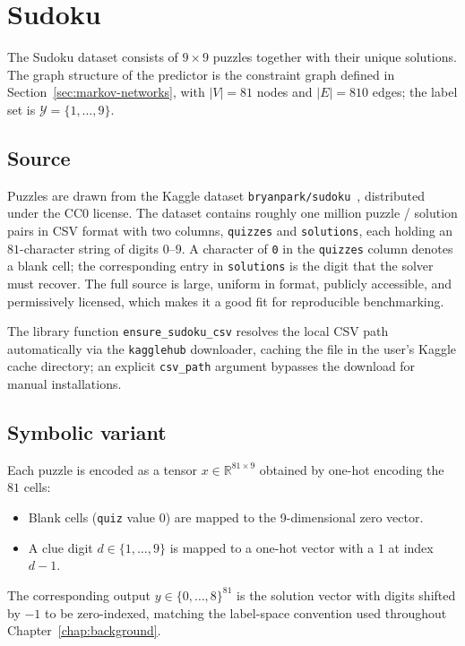 \section{Sudoku}
\label{sec:datasets-sudoku}

The Sudoku dataset consists of $9 \times 9$ puzzles together with
their unique solutions. The graph structure of the predictor is the
constraint graph defined in Section~\ref{sec:markov-networks}, with
$|V| = 81$ nodes and $|E| = 810$ edges; the label set is
$\mathcal{Y} = \{1, \ldots, 9\}$.

\subsection{Source}
\label{subsec:sudoku-source}

Puzzles are drawn from the Kaggle dataset
\texttt{bryanpark/sudoku}~\cite{park2018sudoku}, distributed under
the CC0 license. The dataset contains roughly one million puzzle
/ solution pairs in CSV format with two columns,
\texttt{quizzes} and \texttt{solutions}, each holding an
$81$-character string of digits $0$--$9$. A character of
\texttt{0} in the \texttt{quizzes} column denotes a blank cell;
the corresponding entry in \texttt{solutions} is the digit that
the solver must recover. The full source is large, uniform in
format, publicly accessible, and permissively licensed, which
makes it a good fit for reproducible benchmarking.

The library function \texttt{ensure\_sudoku\_csv} resolves the
local CSV path automatically via the \texttt{kagglehub} downloader,
caching the file in the user's Kaggle cache directory; an
explicit \texttt{csv\_path} argument bypasses the download for
manual installations.

\subsection{Symbolic variant}
\label{subsec:sudoku-symbolic}

Each puzzle is encoded as a tensor
$x \in \mathbb{R}^{81 \times 9}$ obtained by one-hot encoding
the $81$ cells:
\begin{itemize}
    \item Blank cells (\texttt{quiz} value $0$) are mapped to the
    9-dimensional zero vector.
    \item A clue digit $d \in \{1, \ldots, 9\}$ is mapped to a
    one-hot vector with a $1$ at index $d - 1$.
\end{itemize}
The corresponding output $y \in \{0, \ldots, 8\}^{81}$ is the
solution vector with digits shifted by $-1$ to be zero-indexed,
matching the label-space convention used throughout
Chapter~\ref{chap:background}.

